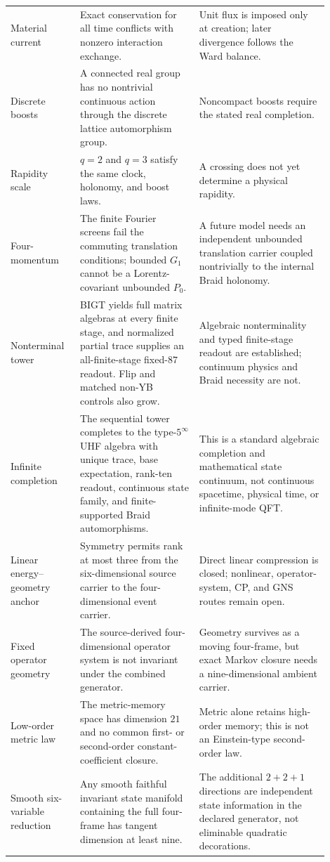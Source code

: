 \documentclass[11pt]{article}
\theoremstyle{definition}
\theoremstyle{remark}
\begin{document}
\begin{longtable}{>{\raggedright\arraybackslash}p{0.19\linewidth}>{\raggedright\arraybackslash}p{0.34\linewidth}>{\raggedright\arraybackslash}p{0.37\linewidth}}
Material current & Exact conservation for all time conflicts with nonzero interaction exchange. & Unit flux is imposed only at creation; later divergence follows the Ward balance.\\
Discrete boosts & A connected real group has no nontrivial continuous action through the discrete lattice automorphism group. & Noncompact boosts require the stated real completion.\\
Rapidity scale & $q=2$ and $q=3$ satisfy the same clock, holonomy, and boost laws. & A crossing does not yet determine a physical rapidity.\\
Four-momentum & The finite Fourier screens fail the commuting translation conditions; bounded $G_1$ cannot be a Lorentz-covariant unbounded $P_0$. & A future model needs an independent unbounded translation carrier coupled nontrivially to the internal Braid holonomy.\\
Nonterminal tower & BIGT yields full matrix algebras at every finite stage, and normalized partial trace supplies an all-finite-stage fixed-$87$ readout. Flip and matched non-YB controls also grow. & Algebraic nonterminality and typed finite-stage readout are established; continuum physics and Braid necessity are not.\\
Infinite completion & The sequential tower completes to the type-$5^\infty$ UHF algebra with unique trace, base expectation, rank-ten readout, continuous state family, and finite-supported Braid automorphisms. & This is a standard algebraic completion and mathematical state continuum, not continuous spacetime, physical time, or infinite-mode QFT.\\
Linear energy--geometry anchor & Symmetry permits rank at most three from the six-dimensional source carrier to the four-dimensional event carrier. & Direct linear compression is closed; nonlinear, operator-system, CP, and GNS routes remain open.\\
Fixed operator geometry & The source-derived four-dimensional operator system is not invariant under the combined generator. & Geometry survives as a moving four-frame, but exact Markov closure needs a nine-dimensional ambient carrier.\\
Low-order metric law & The metric-memory space has dimension $21$ and no common first- or second-order constant-coefficient closure. & Metric alone retains high-order memory; this is not an Einstein-type second-order law.\\
Smooth six-variable reduction & Any smooth faithful invariant state manifold containing the full four-frame has tangent dimension at least nine. & The additional $2+2+1$ directions are independent state information in the declared generator, not eliminable quadratic decorations.\\

\end{longtable}
\end{document}
